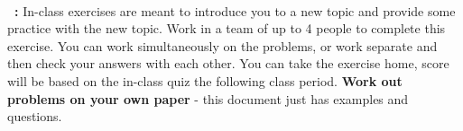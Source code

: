 \footnotesize
~\\ 
\textbf{\laChapter\ \laType: } In-class exercises are meant to introduce you to a new topic
and provide some practice with the new topic. Work in a team of up to 4 people to complete this exercise.
You can work simultaneously on the problems, or work separate and then check your answers with each other.
You can take the exercise home, score will be based on the in-class quiz the following class period.
\textbf{Work out problems on your own paper} - this document just has examples and questions.

\hrulefill
\normalsize 
